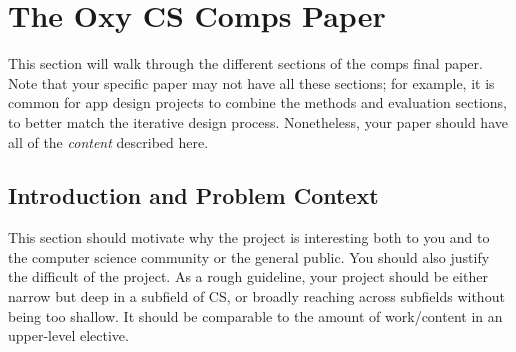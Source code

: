 \documentclass[10pt,twocolumn]{article}
\begin{document}

\section{The Oxy CS Comps Paper}
\label{sec:paper}

This section will walk through the different sections of the comps final paper.
Note that your specific paper may not have all these sections; for example, it is common for app design projects to combine the methods and evaluation sections, to better match the iterative design process.
Nonetheless, your paper should have all of the \textit{content} described here.

\subsection{Introduction and Problem Context}

This section should motivate why the project is interesting both to you and to the computer science community or the general public.
You should also justify the difficult of the project.
As a rough guideline, your project should be either narrow but deep in a subfield of CS, or broadly reaching across subfields without being too shallow.
It should be comparable to the amount of work/content in an upper-level elective.
\end{document}
